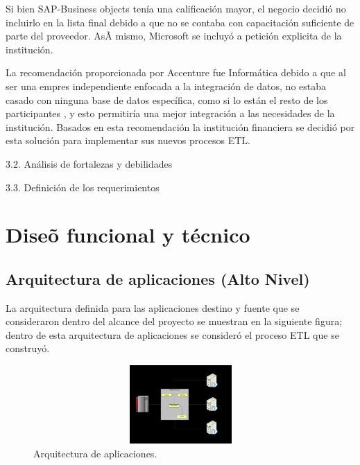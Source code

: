 \documentclass[a4paper,openright,12pt]{book}
\begin{document}
Si bien SAP-Business objects tenía una calificación mayor, el negocio decidió no incluirlo en la lista final debido a que no se contaba con capacitación suficiente de parte del proveedor. AsÃ­ mismo, Microsoft se incluyó a petición explicita de la institución. 

La recomendación proporcionada por Accenture fue Informática debido a que al ser una empres independiente enfocada a la integración de datos, no estaba casado con ninguna base de datos específica, como si lo están el resto de los participantes , y esto permitiría una mejor integración a las necesidades de la institución. Basados en esta recomendación la institución financiera se decidió por esta solución para implementar sus nuevos procesos ETL.


3.2. Análisis de fortalezas y debilidades

3.3. Definición de los requerimientos

\chapter*{Dise\~o funcional y técnico} \label{cap.diseno}%

\section{Arquitectura de aplicaciones (Alto Nivel)}
La arquitectura definida para las aplicaciones destino y fuente que se consideraron dentro del alcance del proyecto se muestran en la siguiente figura; dentro de esta arquitectura de aplicaciones se consideró el proceso ETL que se construyó.

\begin{figure}[htb]
  \begin{center}
    \includegraphics[width=12cm, height=3cm, scale=0.5]{Arquitectura.jpg}
        \caption{Arquitectura de aplicaciones.}
    \label{fig:arquitectura}
  \end{center}
\end{figure}
\end{document}
